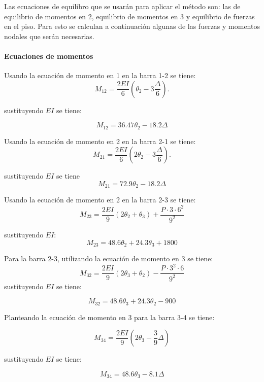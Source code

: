Las ecuaciones de equilibro que se usarán para aplicar el método son: las de equilibrio de momentos en 2, equilibrio de momentos en 3 y equilibrio de fuerzas en el piso. Para esto se calculan a continuación algunas de las fuerzas y momentos nodales que serán necesarias.

\paragraph{Ecuaciones de momentos}


Usando la ecuación de momento en 1 en la barra 1-2 se tiene:
$$
M_{12} = \frac{2EI}{6} \left( \theta_2 - 3 \frac{ \Delta } {6} \right).
$$

sustituyendo $EI$ se tiene:

\begin{equation}
\boxed{
	M_{12}  = 36.47 \theta_2 - 18.2 \Delta}
\end{equation}

Usando la ecuación de momento en 2 en la barra 2-1 se tiene:
$$
	M_{21} = \frac{2EI}{6} \left( 2\theta_2 - 3 \frac{ \Delta } {6} \right).
$$

sustituyendo $EI$ se tiene%
\begin{equation}
\boxed{
M_{21}  = 72.9 \theta_2 - 18.2 \Delta}
\end{equation}
 
Usando la ecuación de momento en 2 en la barra 2-3 se tiene:
$$
	M_{23} = \frac{2EI}{9} \left(2\theta_2 +\theta_3 \right) + \frac{ P \cdot 3 \cdot 6^2}{9^2}
$$

sustituyendo $EI$:
%
\begin{equation}
\boxed{
M_{23} = 48.6 \theta_2 + 24.3 \theta_3  + 1800
}
\end{equation}

Para la barra 2-3, utilizando la ecuación de momento en 3 se tiene:
$$
M_{32} = \frac{2EI}{9} \left(2\theta_3 +\theta_2 \right) - \frac{P \cdot 3^2 \cdot 6}{9^2}
$$
sustituyendo $EI$ se tiene:

\begin{equation}
\boxed{
M_{32} = 48.6 \theta_3 + 24.3 \theta_2 - 900
}
\end{equation}

Planteando la ecuación de momento en 3 para la barra 3-4 se tiene:

$$
M_{34} = \frac{2EI}{9} \left(2\theta_3 - \frac{3}{9} \Delta \right)
$$

sustituyendo $EI$ se tiene:

\begin{equation}
\boxed{
	M_{34} = 48.6 \theta_3 - 8.1 \Delta
}
\end{equation}

